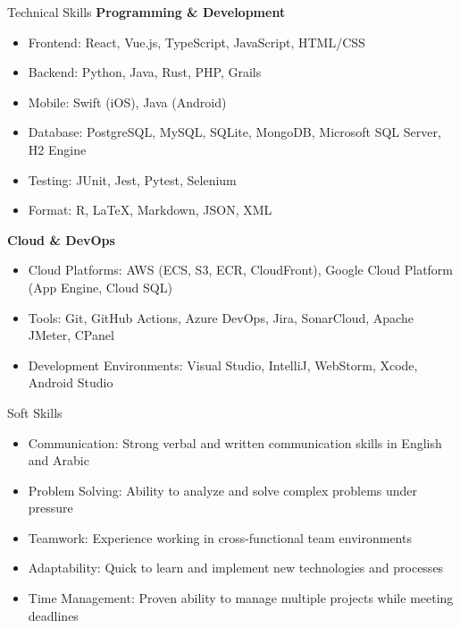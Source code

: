 \documentclass{article}
\newlength{\tabin}
\newlength{\secsep}
\newcommand{\lineunder}{\vspace*{-8pt} \\ \hspace*{-6pt} \hrulefill \\ \vspace*{-15pt}}
\newenvironment{tabbedsection}[1]{
    \begin{list}{}{
        \setlength{\itemsep}{0pt}
        \setlength{\labelsep}{0pt}
        \setlength{\labelwidth}{0pt}
        \setlength{\leftmargin}{\tabin}
        \setlength{\rightmargin}{\tabin}
        \setlength{\listparindent}{0pt}
        \setlength{\parsep}{0pt}
        \setlength{\parskip}{0pt}
        \setlength{\partopsep}{0pt}
        \setlength{\topsep}{#1}
    }
        \item[]
        }{
    \end{list}}
\newenvironment{resume_section}[1]{
    \vspace{2\secsep}
    \textsc{\large#1}
    \lineunder
    \begin{tabbedsection}{\secsep}
    }{\end{tabbedsection}}
\newenvironment{subitems}{
    \renewcommand{\labelitemi}{-}
    \begin{itemize}
        \setlength{\labelsep}{1em}
        }{
    \end{itemize}}
\begin{document}
    \begin{resume_section}{Technical Skills}
        \textbf{Programming \& Development}
        \begin{subitems}
            \item Frontend: React, Vue.js, TypeScript, JavaScript, HTML/CSS
            \item Backend: Python, Java, Rust, PHP, Grails
            \item Mobile: Swift (iOS), Java (Android)
            \item Database: PostgreSQL, MySQL, SQLite, MongoDB, Microsoft SQL Server, H2 Engine
            \item Testing: JUnit, Jest, Pytest, Selenium
            \item Format: R, LaTeX, Markdown, JSON, XML
        \end{subitems}
        \textbf{Cloud \& DevOps}
        \begin{subitems}
            \item Cloud Platforms: AWS (ECS, S3, ECR, CloudFront), Google Cloud Platform (App Engine, Cloud SQL)
            \item Tools: Git, GitHub Actions, Azure DevOps, Jira, SonarCloud, Apache JMeter, CPanel
            \item Development Environments: Visual Studio, IntelliJ, WebStorm, Xcode, Android Studio
        \end{subitems}
    \end{resume_section}

    \begin{resume_section}{Soft Skills}
        \begin{subitems}
            \item Communication: Strong verbal and written communication skills in English and Arabic
            \item Problem Solving: Ability to analyze and solve complex problems under pressure
            \item Teamwork: Experience working in cross-functional team environments
            \item Adaptability: Quick to learn and implement new technologies and processes
            \item Time Management: Proven ability to manage multiple projects while meeting deadlines
        \end{subitems}
    \end{resume_section}
\end{document}
